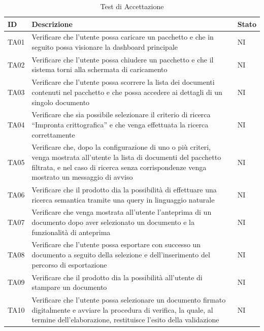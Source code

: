 \documentclass[a4paper,12pt]{article}
\begin{document}
        \begin{longtable}{|M{1.5cm}|M{8.5cm}|M{2cm}|}

                \caption{Test di Accettazione} \\
                \hline
                \textbf{ID} & \textbf{Descrizione} & \textbf{Stato} \\
                \hline
                \endhead

                TA01 & Verificare che l'utente possa caricare un pacchetto e che in seguito possa visionare la dashboard principale & NI \\
                \hline
                
                TA02 & Verificare che l'utente possa chiudere un pacchetto e che il sistema torni alla schermata di caricamento & NI \\
                \hline

                TA03 & Verificare che l’utente possa scorrere la lista dei documenti contenuti nel pacchetto e che possa accedere ai dettagli di un singolo documento & NI \\
                \hline
                
                TA04 & Verificare che sia possibile selezionare il criterio di ricerca “Impronta crittografica” e che venga effettuata la ricerca correttamente & NI \\
                \hline

                TA05 & Verificare che, dopo la configurazione di uno o più criteri, venga mostrata all'utente la lista di documenti del pacchetto filtrata, e nel caso di ricerca senza corrispondenze venga mostrato un messaggio di avviso & NI \\
                \hline
                
                TA06 & Verificare che il prodotto dia la possibilità di effettuare una ricerca semantica tramite una query in linguaggio naturale & NI \\
                \hline

                TA07 & Verificare che venga mostrata all’utente l’anteprima di un documento dopo aver selezionato un documento e la funzionalità di anteprima & NI \\
                \hline
                
                TA08 & Verificare che l’utente possa esportare con successo un documento a seguito della selezione e dell’inserimento del percorso di esportazione & NI \\
                \hline

                TA09 & Verificare che il prodotto dia la possibilità all’utente di stampare un documento & NI \\
                \hline

                TA10 & Verificare che l’utente possa selezionare un documento firmato digitalmente e avviare la procedura di verifica, la quale, al termine dell’elaborazione, restituisce l’esito della validazione & NI \\
                \hline

        \end{longtable}
\end{document}

